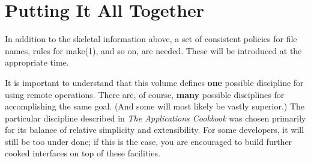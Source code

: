 \section	{Putting It All Together}
In addition to the skeletal information above,
a set of consistent policies for file names, rules for \man make(1), and so on,
are needed.
These will be introduced at the appropriate time.

It is important to understand that this volume
defines {\bf one\/} possible discipline for using remote operations.
There are, of course, {\bf many\/} possible disciplines for accomplishing the
same goal.
(And some will most likely be vastly superior.)
The particular discipline described in {\sl The Applications Cookbook} was
chosen primarily for its balance of relative simplicity and extensibility.
For some developers, it will still be too under done;
if this is the case, you are encouraged to build further cooked interfaces
on top of these facilities.
